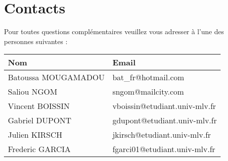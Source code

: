 \section*{Contacts}

Pour toutes questions compl{\'e}mentaires veuillez vous adresser {\`a} l'une
des personnes suivantes :\\

\begin{tabular}{|l|l|}
\hline
Nom & Email \\
\hline
Batoussa MOUGAMADOU & bat\_fr@hotmail.com\\
\hline
Saliou NGOM & sngom@mailcity.com\\
\hline
Vincent BOISSIN & vboissin@etudiant.univ-mlv.fr\\
\hline
Gabriel DUPONT & gdupont@etudiant.univ-mlv.fr\\
\hline
Julien KIRSCH & jkirsch@etudiant.univ-mlv.fr\\
\hline
Frederic GARCIA & fgarci01@etudiant.univ-mlv.fr\\
\hline
\end{tabular}

